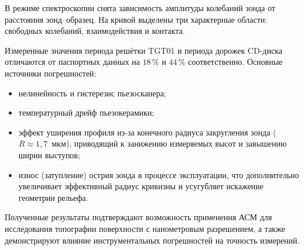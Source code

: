 \documentclass[12pt, a4paper]{article}
\begin{document}
В режиме спектроскопии снята зависимость амплитуды колебаний зонда от расстояния зонд--образец. На кривой выделены три характерные области: свободных колебаний, взаимодействия и контакта.%

Измеренные значения периода решётки TGT01 и периода дорожек CD-диска отличаются от паспортных данных на $18\,\%$ и $44\,\%$ соответственно. Основные источники погрешностей:
\begin{itemize}
    \item нелинейность и гистерезис пьезосканера;
    \item температурный дрейф пьезокерамики;
    \item эффект уширения профиля из-за конечного радиуса закругления зонда ($R \approx 1{,}7$~мкм), приводящий к занижению измеряемых высот и завышению ширин выступов;
    \item износ (затупление) острия зонда в процессе эксплуатации, что дополнительно увеличивает эффективный радиус кривизны и усугубляет искажение геометрии рельефа.
\end{itemize}

Полученные результаты подтверждают возможность применения АСМ для исследования топографии поверхности с нанометровым разрешением, а также демонстрируют влияние инструментальных погрешностей на точность измерений.
\end{document}
